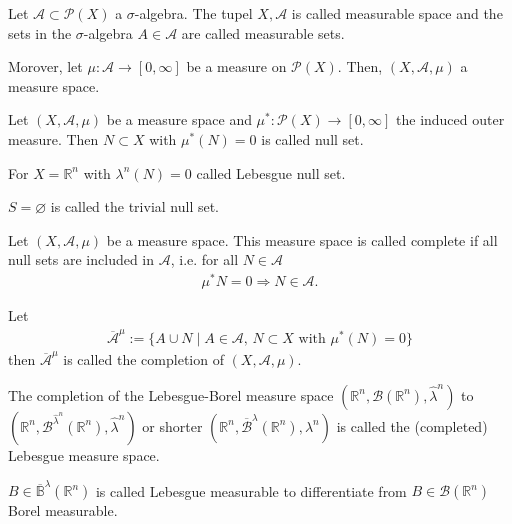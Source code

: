 \begin{definition}
    Let \(\mathcal{A} \subset \mathcal{P}(X)\) a \(\sigma\)-algebra. The tupel \(X, \mathcal{A}\) is called measurable space and the sets in the \(\sigma\)-algebra \(A \in \mathcal{A}\) are called measurable sets.

    Morover, let \(\mu: \mathcal{A} \rightarrow [0, \infty]\) be a measure on \(\mathcal{P}(X)\). Then, \((X, \mathcal{A}, \mu)\) a measure space.
\end{definition}

\begin{definition}
    Let \((X, \mathcal{A}, \mu)\) be a measure space and \(\mu^*: \mathcal{P}(X) \rightarrow [0, \infty]\) the induced outer measure. Then \(N \subset X\) with \(\mu^*(N) = 0\) is called null set.

    For \(X = \mathbb{R}^n\) with \(\lambda^n(N) = 0\) called Lebesgue null set.

    \(S = \varnothing\) is called the trivial null set.
\end{definition}

\begin{definition}
    Let \((X, \mathcal{A}, \mu)\) be a measure space. This measure space is called complete if all null sets are included in \(\mathcal{A}\), i.e. for all \(N \in \mathcal{A}\)
    \begin{align}
        \mu^*{N} = 0 \Rightarrow N \in \mathcal{A} \text{.}
    \end{align}
\end{definition}

\begin{definition}
    Let
    \begin{align}
        \overline{\mathcal{A}}^\mu := \{ A \cup N \mid A \in \mathcal{A}, \, N \subset X \text{ with } \mu^*(N) = 0 \}
    \end{align}
    then \(\overline{\mathcal{A}}^\mu\) is called the completion of \((X, \mathcal{A}, \mu)\).
\end{definition}

\begin{definition}
    The completion of the Lebesgue-Borel measure space \( (\mathbb{R}^n, \mathcal{B}(\mathbb{R}^n), \hat{\lambda}^n) \) to \( (\mathbb{R}^n, \mathcal{B}^{\hat{\lambda}^n}(\mathbb{R}^n), \hat{\lambda}^n) \) or shorter \( (\mathbb{R}^n, \overline{\mathcal{B}}^\lambda (\mathbb{R}^n), \lambda^n)\) is called the (completed) Lebesgue measure space.

    \(B \in \overline{\mathbb{B}}^\lambda(\mathbb{R}^n)\) is called Lebesgue measurable to differentiate from \(B \in \mathcal{B}(\mathbb{R}^n)\) Borel measurable.
\end{definition}

